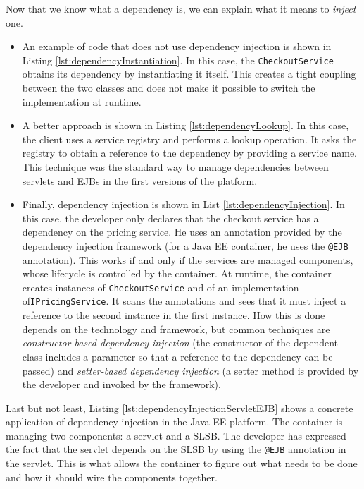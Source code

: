 Now that we know what a dependency is, we can explain what it means to \emph{inject} one.

\begin{itemize}
\item An example of code that does not use dependency injection is shown in Listing \ref{lst:dependencyInstantiation}. In this case, the \texttt{CheckoutService} obtains its dependency by instantiating it itself. This creates a tight coupling between the two classes and does not make it possible to switch the implementation at runtime.
\item A better approach is shown in Listing \ref{lst:dependencyLookup}. In this case, the client uses a service registry and performs a lookup operation. It asks the registry to obtain a reference to the dependency by providing a service name. This technique was the standard way to manage dependencies between servlets and \ac{EJB}s in the first versions of the platform.
\item Finally, dependency injection is shown in List \ref{lst:dependencyInjection}. In this case, the developer only declares that the checkout service has a dependency on the pricing service. He uses an annotation provided by the dependency injection framework (for a \ac{Java EE} container, he uses the \texttt{@EJB} annotation). This works if and only if the services are managed components, whose lifecycle is controlled by the container. At runtime, the container creates instances of \texttt{CheckoutService} and of an implementation of\texttt{IPricingService}. It scans the annotations and sees that it must inject a reference to the second instance in the first instance. How this is done depends on the technology and framework, but common techniques are \emph{constructor-based dependency injection} (the constructor of the dependent class includes a parameter so that a reference to the dependency can be passed) and \emph{setter-based dependency injection} (a setter method is provided by the developer and invoked by the framework).
\end{itemize}


Last but not least, Listing \ref{lst:dependencyInjectionServletEJB} shows a concrete application of dependency injection in the \ac{Java EE} platform. The container is managing two components: a servlet and a \ac{SLSB}. The developer has expressed the fact that the servlet depends on the \ac{SLSB} by using the \texttt{@EJB} annotation in the servlet. This is what allows the container to figure out what needs to be done and how it should wire the components together.

